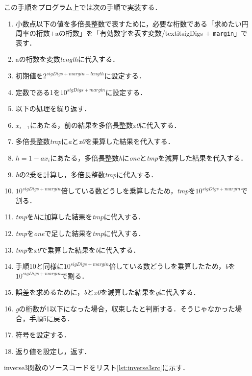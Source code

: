 \documentclass[a4paper,11pt,dvipdfmx]{jsarticle}
\begin{document}
この手順をプログラム上では次の手順で実装する．

\begin{enumerate}
\item 小数点以下の値を多倍長整数で表すために，必要な桁数である「求めたい円周率の桁数$+$aの桁数」を「有効数字を表す変数/textit{sigDigs}
 $+$ \texttt{margin}」で表す．
\item aの桁数を変数\textit{length}に代入する．
\item 初期値を$2^{sigDigs + margin - length}$に設定する．
\item 定数である1を$10^{sigDigs + margin}$に設定する．
\item 以下の処理を繰り返す．
\item $x_{i - 1}$にあたる，前の結果を多倍長整数\textit{x0}に代入する．
\item 多倍長整数\textit{tmp}に\textit{a}と\textit{x0}を乗算した結果を代入する．
\item $h = 1 - ax_i$にあたる，多倍長整数\textit{h}に\textit{one}と\textit{tmp}を減算した結果を代入する．
\item \textit{h}の2乗を計算し，多倍長整数\textit{tmp}に代入する．
\item $10^{sigDigs + margin}$倍している数どうしを乗算したため，\textit{tmp}を$10^{sigDigs + margin}$で割る．
\item \textit{tmp}を\textit{h}に加算した結果を\textit{tmp}に代入する．
\item \textit{tmp}を\textit{one}で足した結果を\textit{tmp}に代入する．
\item \textit{tmp}を\textit{x0}で乗算した結果を\textit{b}に代入する．
\item 手順10と同様に$10^{sigDigs + margin}$倍している数どうしを乗算したため，\textit{b}を$10^{sigDigs + margin}$で割る．
\item 誤差を求めるために，\textit{b}と\textit{x0}を減算した結果を\textit{g}に代入する．
\item \textit{g}の桁数が1以下になった場合，収束したと判断する．そうじゃなかった場合，手順5に戻る．
\item 符号を設定する．
\item 返り値を設定し，返す．
\end{enumerate}

inverse3関数のソースコードをリスト\ref{lst:inverse3src}に示す．
\end{document}
